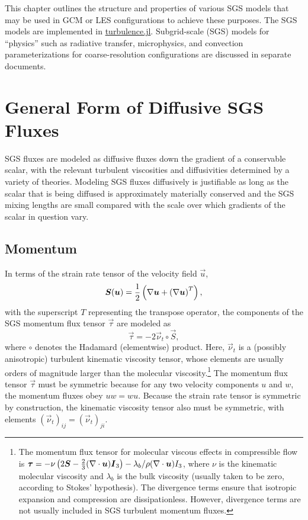 \documentclass{report}
\begin{document}
This chapter outlines the structure and properties of various SGS models that may be used in GCM or LES configurations to achieve these purposes. The SGS models are implemented in \href{https://github.com/climate-machine/CLIMA/blob/master/src/Atmos/Model/turbulence.jl}{turbulence.jl}. Subgrid-scale (SGS) models for ``physics'' such as radiative transfer, microphysics, and convection parameterizations for coarse-resolution configurations are discussed in  separate documents. 

\section{General Form of Diffusive SGS Fluxes}\label{s:sgs_fluxes_form}

SGS fluxes are modeled as diffusive fluxes down the gradient of a conservable scalar, with the relevant turbulent viscosities and diffusivities determined by a variety of theories. Modeling SGS fluxes diffusively is justifiable as long as the scalar that is being diffused is approximately materially conserved and the SGS mixing lengths are small compared with the scale over which gradients of the scalar in question vary. 

\subsection{Momentum}

In terms of the strain rate tensor of the velocity field $\vec{u}$,
\begin{equation}\label{e:strain_rate}
\boldsymbol{{S}}(\boldsymbol{{u}}) = \frac{1}{2}  \left(\nabla \boldsymbol{{u}} +  \left( \nabla \boldsymbol{{u}} \right)^T \right),
\end{equation}
with the superscript $T$ representing the transpose operator, the components of the SGS momentum flux tensor $\vec{\tau}$ are modeled as
\begin{equation}\label{e:sgs_momentum_flux}
\vec{\tau} =  - 2 \vec{\nu}_t \circ \vec{S},
\end{equation}
where $\circ$ denotes the Hadamard (elementwise) product. Here, $\vec{\nu}_t$ is a (possibly anisotropic) turbulent kinematic viscosity tensor, whose elements are usually orders of magnitude larger than the molecular viscosity.\footnote{The momentum flux tensor for molecular viscous effects in compressible flow is $\boldsymbol{{\tau}}  =  - \nu \left( 2\boldsymbol{{S}}  - \frac{2}{3} (\nabla \cdot \boldsymbol{{u}}) \boldsymbol{{I}}_3 \right) - \lambda_b/\rho (\nabla \cdot \boldsymbol{{u}}) I_3$, where $\nu$ is the kinematic molecular viscosity and $\lambda_b$ is the bulk viscosity (usually taken to be zero, according to Stokes' hypothesis). The divergence terms ensure that isotropic expansion and compression are dissipationless. However, divergence terms are not usually included in SGS turbulent momentum fluxes.} The momentum flux tensor $\vec{\tau}$ must be symmetric because for any two velocity components $u$ and $w$, the momentum fluxes obey $uw = wu$. Because the strain rate tensor is symmetric by construction, the kinematic viscosity tensor also must be symmetric, with elements $(\vec{\nu}_t)_{ij} = (\vec{\nu}_t)_{ji}$.
\end{document}
